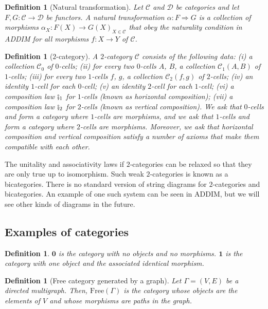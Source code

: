 \documentclass[11pt,a4paper,openright,twoside]{report}
\theoremstyle{plain}
\newtheorem{definition}[proposition]{Definition}
\theoremstyle{definition}
\begin{document}
\begin{definition}[Natural transformation]
  Let $\mathcal{C}$ and $\mathcal{D}$ be categories and let $F,G: \mathcal{C} \to \mathcal{D}$ be functors. A natural transformation $\alpha: F \Rightarrow G$ is a collection of morphisms ${\alpha_X: F(X) \to G(X)}_{X \in \mathcal{C}}$ that obey the naturality condition in ADDIM for all morphisms $f: X \to Y$ of $\mathcal{C}$.
\end{definition}

\begin{definition}[$2$-category]
  A $2$-category $\mathcal{C}$ consists of the following data: (i) a collection $\mathcal{C}_0$ of $0$-cells; (ii) for every two $0$-cells $A$, $B$, a collection $\mathcal{C}_1(A,B)$ of $1$-cells;  (iii) for every two $1$-cells $f$, $g$, a collection $\mathcal{C}_2(f,g)$ of $2$-cells; (iv) an identity $1$-cell for each $0$-cell; (v) an identity $2$-cell for each $1$-cell; (vi) a composition law $\fatsemi_1$ for $1$-cells (known as horizontal composition); (vii) a composition law $\fatsemi_2$ for $2$-cells (known as vertical composition).
  We ask that $0$-cells and form a category where $1$-cells are morphisms, and we ask that $1$-cells and form a category where $2$-cells are morphisms. Moreover, we ask that horizontal composition and vertical composition satisfy a number of axioms that make them compatible with each other.
\end{definition}

The unitality and associativity laws if $2$-categories can be relaxed so that they are only true up to isomorphism. Such weak $2$-categories is known as a bicategories. There is no standard version of string diagrams for $2$-categories and bicategories. An example of one such system can be seen in ADDIM, but we will see other kinds of diagrams in the future.


\subsection{Examples of categories}

\begin{definition}
  $\mathbf{0}$ is the category with no objects and no morphisms. $\mathbf{1}$ is the category with one object and the associated identical morphism.
\end{definition}

\begin{definition}[Free category generated by a graph]
  \label{def: free}
  Let $\Gamma = (V,E)$ be a directed multigraph. Then, $\mathrm{Free}(\Gamma)$ is the category whose objects are the elements of $V$ and whose morphisms are paths in the graph.
\end{definition}
\end{document}
